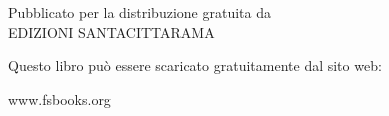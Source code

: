 \cleartorecto
\thispagestyle{empty}

{\raggedleft
\firaSansLightFont
\color[gray]{0.35}%

\vspace*{4\baselineskip}
\setlength{\parskip}{1em}
\setlength{\parindent}{0pt}

{\fontsize{22}{25}\selectfont
\color[gray]{0.3}%
\MakeUppercase{\thetitle}}

\vspace*{0.9\baselineskip}

{\fontsize{12}{15}\selectfont
\theauthor}

\vfill

Pubblicato per la distribuzione gratuita da\\
EDIZIONI SANTACITTARAMA

{\fontsize{9}{12}\selectfont
Questo libro può essere scaricato gratuitamente dal sito web:}

\vspace*{-0.8\baselineskip}%
{\fontsize{9}{12}\selectfont
www.fsbooks.org}%

}

